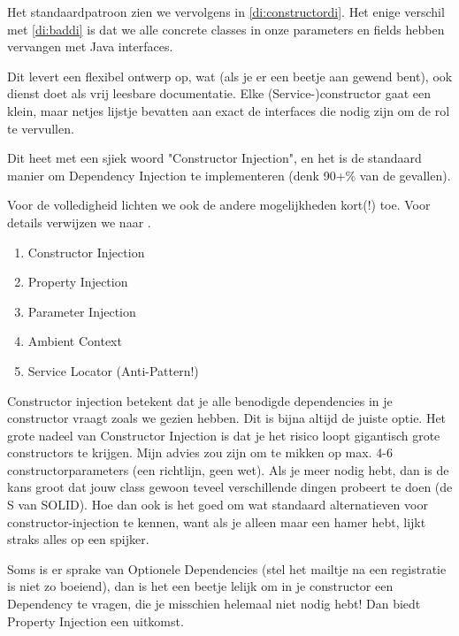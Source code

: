 Het standaardpatroon zien we vervolgens in \ref{di:constructordi}. Het enige verschil met \ref{di:baddi} 
is dat we alle concrete classes in onze parameters en fields hebben vervangen met Java interfaces.

Dit levert een flexibel ontwerp op, wat (als je er een beetje aan gewend bent), ook dienst doet
als vrij leesbare documentatie. Elke (Service-)constructor gaat een klein, maar netjes lijstje bevatten
aan exact de interfaces die nodig zijn om de rol te vervullen.

Dit heet met een sjiek woord "Constructor Injection", en het is de standaard manier om Dependency Injection
te implementeren (denk 90+\% van de gevallen).

Voor de volledigheid lichten we ook de andere mogelijkheden kort(!) toe. Voor details verwijzen we naar \cite{SeemannDependencyInjection}.

\begin{enumerate}
    \item Constructor Injection
    \item Property Injection
    \item Parameter Injection
    \item Ambient Context
    \item Service Locator (Anti-Pattern!)
\end{enumerate}

Constructor injection betekent dat je alle benodigde dependencies in je constructor vraagt zoals we
gezien hebben. Dit is bijna altijd de juiste optie. Het grote nadeel van Constructor Injection is
dat je het risico loopt gigantisch grote constructors te krijgen. Mijn advies zou zijn om te mikken
op max. 4-6 constructorparameters (een richtlijn, geen wet). 
Als je meer nodig hebt, dan is de kans groot dat jouw class gewoon teveel verschillende dingen 
probeert te doen (de S van SOLID). Hoe dan ook is het goed om wat standaard alternatieven voor
constructor-injection te kennen, want als je alleen maar een hamer hebt, lijkt straks alles op een 
spijker.

Soms is er sprake van Optionele Dependencies (stel het mailtje na een registratie is niet zo boeiend),
dan is het een beetje lelijk om in je constructor een Dependency te vragen, die je misschien helemaal
niet nodig hebt! Dan biedt Property Injection een uitkomst.

